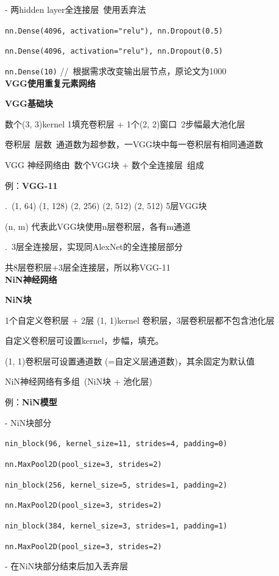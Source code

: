 \documentclass[UTF8]{ctexart}
\begin{document}
  \quad - 两hidden layer全连接层\ 使用丢弃法

  \quad \texttt{nn.Dense(4096, activation="relu"), nn.Dropout(0.5)}
  
  \quad \texttt{nn.Dense(4096, activation="relu"), nn.Dropout(0.5)}
  
  \quad \texttt{nn.Dense(10)} //\ 根据需求改变输出层节点，原论文为1000\\
\textbf{VGG使用重复元素网络}

  \textbf{VGG基础块}

  \quad 数个(3, 3)kernel 1填充卷积层 + 1个(2, 2)窗口\ 2步幅最大池化层

  \quad 卷积层\ 层数\ 通道数为超参数，一VGG块中每一卷积层有相同通道数

  VGG 神经网络由\ 数个VGG块 + 数个全连接层\ 组成

  例：\textbf{VGG-11}
  
  .\ (1, 64) (1, 128) (2, 256) (2, 512) (2, 512) 5层VGG块

  \quad \quad (n, m) 代表此VGG块使用n层卷积层，各有m通道
  
  .\ 3层全连接层，实现同AlexNet的全连接层部分
  
  \quad 共8层卷积层+3层全连接层，所以称VGG-11\\
\textbf{NiN神经网络}

  \textbf{NiN块}

  \quad 1个自定义卷积层 + 2层 (1, 1)kernel 卷积层，3层卷积层都不包含池化层

  \quad 自定义卷积层可设置kernel，步幅，填充。
  
  \quad (1, 1)卷积层可设置通道数 (=自定义层通道数)，其余固定为默认值

  NiN神经网络有多组\ (NiN块 + 池化层)
  
  例：\textbf{NiN模型}

  \quad - NiN块部分

  \quad \texttt{nin\_block(96, kernel\_size=11, strides=4, padding=0)}

  \quad \texttt{nn.MaxPool2D(pool\_size=3, strides=2)}

  \quad \texttt{nin\_block(256, kernel\_size=5, strides=1, padding=2)}

  \quad \texttt{nn.MaxPool2D(pool\_size=3, strides=2)}

  \quad \texttt{nin\_block(384, kernel\_size=3, strides=1, padding=1)}

  \quad \texttt{nn.MaxPool2D(pool\_size=3, strides=2)}

  \quad - 在NiN块部分结束后加入丢弃层
\end{document}
